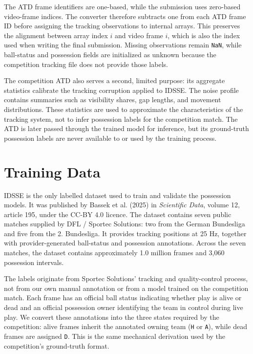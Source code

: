 \documentclass[11pt,a4paper]{article}
\begin{document}
The ATD frame identifiers are one-based, while the submission uses zero-based video-frame indices. The converter therefore subtracts one from each ATD frame ID before assigning the tracking observations to internal arrays. This preserves the alignment between array index \(i\) and video frame \(i\), which is also the index used when writing the final submission. Missing observations remain \texttt{NaN}, while ball-status and possession fields are initialized as unknown because the competition tracking file does not provide those labels.

The competition ATD also serves a second, limited purpose: its aggregate statistics calibrate the tracking corruption applied to IDSSE. The noise profile contains summaries such as visibility shares, gap lengths, and movement distributions. These statistics are used to approximate the characteristics of the tracking system, not to infer possession labels for the competition match. The ATD is later passed through the trained model for inference, but its ground-truth possession labels are never available to or used by the training process.


\section{Training Data}

IDSSE is the only labelled dataset used to train and validate the possession models. It was published by Bassek et al. (2025) in \textit{Scientific Data}, volume 12, article 195, under the CC-BY 4.0 licence. The dataset contains seven public matches supplied by DFL / Sportec Solutions: two from the German Bundesliga and five from the 2. Bundesliga. It provides tracking positions at 25 Hz, together with provider-generated ball-status and possession annotations. Across the seven matches, the dataset contains approximately 1.0 million frames and 3,060 possession intervals.

The labels originate from Sportec Solutions' tracking and quality-control process, not from our own manual annotation or from a model trained on the competition match. Each frame has an official ball status indicating whether play is alive or dead and an official possession owner identifying the team in control during live play. We convert these annotations into the three states required by the competition: alive frames inherit the annotated owning team (\texttt{H} or \texttt{A}), while dead frames are assigned \texttt{D}. This is the same mechanical derivation used by the competition's ground-truth format.
\end{document}
